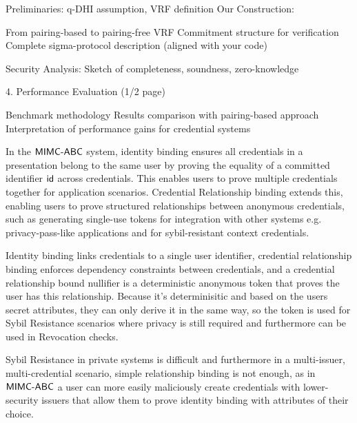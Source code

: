 Preliminaries: q-DHI assumption, VRF definition
Our Construction:

From pairing-based to pairing-free VRF
Commitment structure for verification
Complete sigma-protocol description (aligned with your code)


Security Analysis: Sketch of completeness, soundness, zero-knowledge







4. Performance Evaluation (1/2 page)

Benchmark methodology
Results comparison with pairing-based approach
Interpretation of performance gains for credential systems
























In the $\mathsf{MIMC\text{-}ABC}$ system, identity binding ensures all credentials in a presentation belong to the same user by proving the equality of a committed identifier $\mathsf{id}$ across credentials. This enables users to prove multiple credentials together for application scenarios.
Credential Relationship binding extends this, enabling users to prove structured relationships between anonymous credentials, such as generating single-use tokens for integration with other systems e.g. privacy-pass-like applications \cite{davidson2018privacy} and for sybil-resistant context credentials.

Identity binding links credentials to a single user identifier, credential relationship binding enforces dependency constraints between credentials, and a credential relationship bound nullifier is a deterministic anonymous token that proves the user has this relationship. Because it's determinisitic and based on the users secret attributes, they can only derive it in the same way, so the token is used for Sybil Resistance scenarios where privacy is still required and furthermore can be used in Revocation checks.

Sybil Resistance in private systems is difficult and furthermore in a multi-issuer, multi-credential scenario, simple relationship binding is not enough, as in $\mathsf{MIMC\text{-}ABC}$ a user can more easily maliciously create credentials with lower-security issuers that allow them to prove identity binding with attributes of their choice. 

